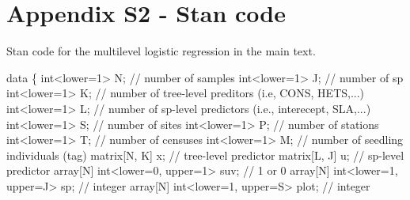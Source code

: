 \documentclass[
  12pt,
  letterpaper,
  DIV=11,
  numbers=noendperiod]{scrartcl}
\newenvironment{Shaded}{\begin{snugshade}}{\end{snugshade}}
\newcommand{\CommentTok}[1]{\textcolor[rgb]{0.37,0.37,0.37}{#1}}
\newcommand{\DataTypeTok}[1]{\textcolor[rgb]{0.68,0.00,0.00}{#1}}
\newcommand{\DecValTok}[1]{\textcolor[rgb]{0.68,0.00,0.00}{#1}}
\newcommand{\KeywordTok}[1]{\textcolor[rgb]{0.00,0.23,0.31}{#1}}
\newcommand{\NormalTok}[1]{\textcolor[rgb]{0.00,0.23,0.31}{#1}}
\begin{document}
\newpage

\hypertarget{appendix-s2---stan-code}{%
\section{Appendix S2 - Stan code}\label{appendix-s2---stan-code}}

Stan code for the multilevel logistic regression in the main text.

\begin{Shaded}
\begin{Highlighting}[]
\KeywordTok{data}\NormalTok{ \{}
  \DataTypeTok{int}\NormalTok{\textless{}}\KeywordTok{lower}\NormalTok{=}\DecValTok{1}\NormalTok{\textgreater{} N; }\CommentTok{// number of samples}
  \DataTypeTok{int}\NormalTok{\textless{}}\KeywordTok{lower}\NormalTok{=}\DecValTok{1}\NormalTok{\textgreater{} J; }\CommentTok{// number of sp}
  \DataTypeTok{int}\NormalTok{\textless{}}\KeywordTok{lower}\NormalTok{=}\DecValTok{1}\NormalTok{\textgreater{} K; }\CommentTok{// number of tree{-}level preditors (i.e, CONS, HETS,...)}
  \DataTypeTok{int}\NormalTok{\textless{}}\KeywordTok{lower}\NormalTok{=}\DecValTok{1}\NormalTok{\textgreater{} L; }\CommentTok{// number of sp{-}level predictors (i.e., interecept, SLA,...)}
  \DataTypeTok{int}\NormalTok{\textless{}}\KeywordTok{lower}\NormalTok{=}\DecValTok{1}\NormalTok{\textgreater{} S; }\CommentTok{// number of sites}
  \DataTypeTok{int}\NormalTok{\textless{}}\KeywordTok{lower}\NormalTok{=}\DecValTok{1}\NormalTok{\textgreater{} P; }\CommentTok{// number of stations}
  \DataTypeTok{int}\NormalTok{\textless{}}\KeywordTok{lower}\NormalTok{=}\DecValTok{1}\NormalTok{\textgreater{} T; }\CommentTok{// number of censuses}
  \DataTypeTok{int}\NormalTok{\textless{}}\KeywordTok{lower}\NormalTok{=}\DecValTok{1}\NormalTok{\textgreater{} M; }\CommentTok{// number of seedling individuals (tag)}
  \DataTypeTok{matrix}\NormalTok{[N, K] x; }\CommentTok{// tree{-}level predictor}
  \DataTypeTok{matrix}\NormalTok{[L, J] u; }\CommentTok{// sp{-}level predictor}
  \DataTypeTok{array}\NormalTok{[N] }\DataTypeTok{int}\NormalTok{\textless{}}\KeywordTok{lower}\NormalTok{=}\DecValTok{0}\NormalTok{, }\KeywordTok{upper}\NormalTok{=}\DecValTok{1}\NormalTok{\textgreater{} suv; }\CommentTok{// 1 or 0}
  \DataTypeTok{array}\NormalTok{[N] }\DataTypeTok{int}\NormalTok{\textless{}}\KeywordTok{lower}\NormalTok{=}\DecValTok{1}\NormalTok{, }\KeywordTok{upper}\NormalTok{=J\textgreater{} sp; }\CommentTok{// integer}
  \DataTypeTok{array}\NormalTok{[N] }\DataTypeTok{int}\NormalTok{\textless{}}\KeywordTok{lower}\NormalTok{=}\DecValTok{1}\NormalTok{, }\KeywordTok{upper}\NormalTok{=S\textgreater{} plot; }\CommentTok{// integer}

\end{Highlighting}
\end{Shaded}
\end{document}
